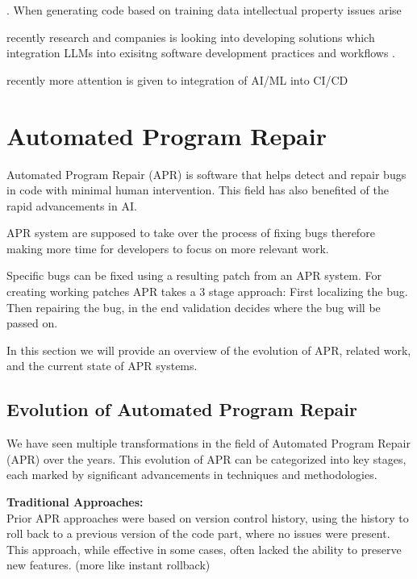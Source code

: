 \cite{bhargavmallampatiRoleGenerativeAI2025, houLargeLanguageModels2024}.
When generating code based on training data intellectual property issues arise  \cite{sauvolaFutureSoftwareDevelopment2024}


recently research and companies is looking into developing solutions which integration LLMs into exisitng software development practices and workflows  \cite{puvvadiCodingAgentsComprehensive2025, dohmkeGitHubCopilotMeet2025, ntroducingCodex, sauvolaFutureSoftwareDevelopment2024}.

recently more attention is given to integration of AI/ML into CI/CD
\cite{mohammedAIDrivenContinuousIntegration2024}

\section{Automated Program Repair}

Automated Program Repair (APR) is software that helps detect and repair bugs in code with minimal human intervention. This field has also benefited of the rapid advancements in AI.

APR system are supposed to take over the process of fixing bugs therefore making more time for developers to focus on more relevant work. \cite{houLargeLanguageModels2024}

Specific bugs can be fixed using a resulting patch from an APR system. For creating working patches APR takes a 3 stage approach: First localizing the bug. Then repairing the bug, in the end validation decides where the bug will be passed on.\cite{}

In this section we will provide an overview of the evolution of APR, related work, and the current state of APR systems.

\subsection{Evolution of Automated Program Repair}
We have seen multiple transformations in the field of Automated Program Repair (APR) over the years. This evolution of APR can be categorized into key stages, each marked by significant advancements in techniques and methodologies.

\textbf{Traditional Approaches:}\\
Prior APR approaches were based on version control history, using the history to roll back to a previous version of the code part, where no issues were present. This approach, while effective in some cases, often lacked the ability to preserve new features. (more like instant rollback)

